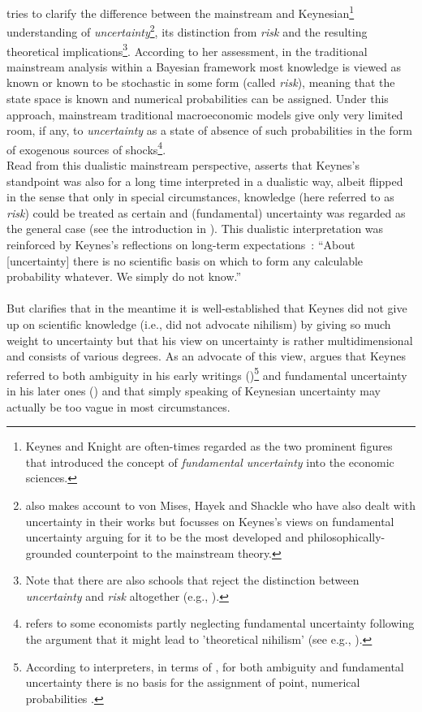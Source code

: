 \documentclass[a4paper,12pt,oneside,pointednumbers,bibtotoc,bigheadings,liststotoc]{scrbook}
\newcommand{\forceindent}{\leavevmode{\parindent=1em\indent}}
\begin{document}
\forceindent \citet{dow:16} tries to clarify the difference between the mainstream and Keynesian\footnote{Keynes and Knight are often-times regarded as the two prominent figures that introduced the concept of \textit{fundamental uncertainty} into the economic sciences.} understanding of \textit{uncertainty}\footnote{\citet{dow:16} also makes account to von Mises, Hayek and Shackle who have also dealt with uncertainty in their works but focusses on Keynes's views on fundamental uncertainty arguing for it to be the most developed and philosophically-grounded counterpoint to the mainstream theory.}, its distinction from \textit{risk} and the resulting theoretical implications\footnote{Note that there are also schools that reject the distinction between \textit{uncertainty} and \textit{risk} altogether (e.g., \citealp{savage:54}).}. According to her assessment, in the traditional mainstream analysis within a Bayesian framework most knowledge is viewed as known or known to be stochastic in some form (called \textit{risk}), meaning that the state space is known and numerical probabilities can be assigned. Under this approach, mainstream traditional macroeconomic models give only very limited room, if any, to \textit{uncertainty} as a state of absence of such probabilities in the form of exogenous sources of shocks\footnote{\citet[p. 43]{dequesh:00} refers to some economists partly neglecting fundamental uncertainty following the argument that it might lead to 'theoretical nihilism' (see e.g., \citealp{coddington:82}).}. \\
Read from this dualistic mainstream perspective, \citet{dow:16} asserts that Keynes's standpoint was also for a long time interpreted in a dualistic way, albeit flipped in the sense that only in special circumstances, knowledge (here referred to as \textit{risk}) could be treated as certain and (fundamental) uncertainty was regarded as the general case (see the introduction in \citealp{keynes:21}). This dualistic interpretation was reinforced by Keynes's reflections on long-term expectations~\citep[p. 214/214]{keynes:37}: 
``About [uncertainty] there is no scientific basis on which to form any calculable probability whatever. We simply do not know.''\\
\\
But \citet{dow:16} clarifies that in the meantime it is well-established that Keynes did not give up on scientific knowledge (i.e., did not advocate nihilism) by giving so much weight to uncertainty but that his view on uncertainty is rather multidimensional and consists of various degrees. As an advocate of this view, \citet{dequesh:00} argues that Keynes referred to both ambiguity in his early writings (\citealp{keynes:21})\footnote{According to interpreters, in terms of \citet{keynes:21}, for both ambiguity and fundamental uncertainty there is no basis for the assignment of point, numerical probabilities \citep{dequesh:00}.} and fundamental uncertainty in his later ones (\citealp{keynes:37}) and that simply speaking of Keynesian uncertainty may actually be too vague in most circumstances. \\
\end{document}
